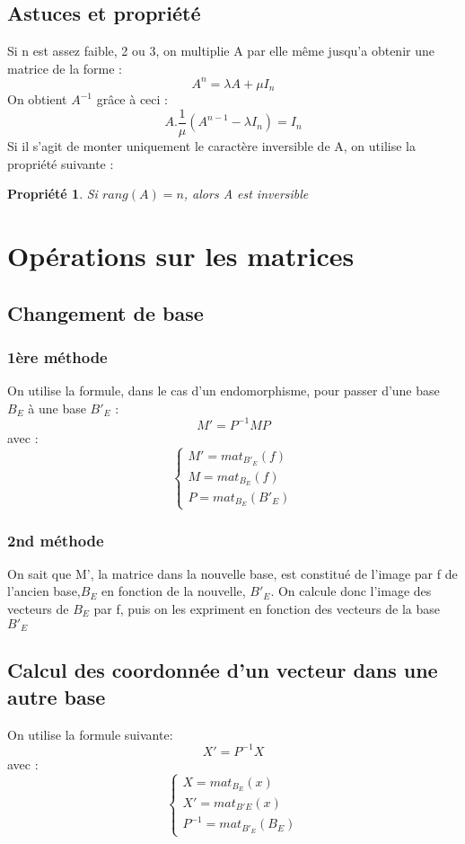 \documentclass[a4paper,12 pt,oneside]{report}     %
\newtheorem{prop}{Propriété}
\begin{document}
\subsection{Astuces et propriété}
Si n est assez faible, 2 ou 3, on multiplie A par elle même jusqu'a obtenir une matrice de la forme : 
$$A^{n}=\lambda A + \mu I_n $$
On obtient $A^{-1}$ grâce à ceci : $$A.\dfrac{1}{\mu}(A^{n-1}- \lambda I_n) = I_n$$
Si il s'agit de monter uniquement le caractère inversible de A, on utilise la propriété suivante :
\begin{prop}
Si $rang(A)=n$, alors A est inversible
\end{prop}
\section{Opérations sur les matrices}
\subsection{Changement de base}
\subsubsection{1ère méthode}
On utilise la formule, dans le cas d'un endomorphisme, pour passer d'une base $B_E$ à une base $B'_E$ :
$$M' = P^{-1}MP$$
avec :
  \[\left\{\begin{array}{l}
   M'=mat_{B'_E}(f)\\
   M=mat_{B_E}(f)\\
   P=mat_{B_E}(B'_E)
  \end{array}\right.
\]
\subsubsection{2nd méthode}
On sait que M', la matrice dans la nouvelle base, est constitué de l'image par f de l'ancien base,$B_E$ en fonction de la nouvelle, $B'_E$. On calcule donc l'image des vecteurs de $B_E$ par f, puis on les expriment en fonction des vecteurs de la base $B'_E$
\subsection{Calcul des coordonnée d'un vecteur dans une autre base}
On utilise la formule suivante: 
$$X'=P^{-1}X$$
avec :
  \[\left\{\begin{array}{l}
   X = mat_{B_E}(x)\\
   X' = mat_{B'E}(x)\\
   P^{-1} = mat_{B'_E}(B_E)
  \end{array}\right.
\]
\end{document}

